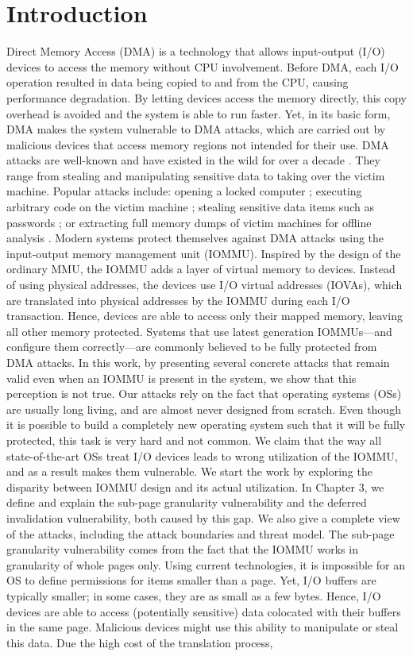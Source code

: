 \section{Introduction}
Direct Memory Access (DMA) is a technology that allows input-output (I/O) devices to access the memory without CPU involvement. Before DMA, each I/O operation resulted in data being copied to and from the CPU, causing performance degradation. By letting devices access the memory directly, this copy overhead is avoided and the system is able to run faster. Yet, in its basic form, DMA makes the system vulnerable to DMA attacks, which are carried out by malicious devices that access memory regions not intended for their use. DMA attacks are well-known and have existed in the wild for over a decade \cite{Dor04,BDK10}. They range from stealing and manipulating sensitive data to taking over the victim machine. Popular attacks include: opening a locked computer \cite{MM, Fin14}; executing arbitrary code on the victim machine \cite{Fri16, Woj08, AD10}; stealing sensitive data items such as passwords \cite{SB12, LKV13, Cim16, BR12}; or extracting full memory dumps of victim machines for offline analysis \cite{MM, Vol, Fin14, GA10}. Modern systems protect themselves against DMA attacks using the input-output memory management unit (IOMMU). Inspired by the design of the ordinary MMU, the IOMMU adds a layer of virtual memory to devices. Instead of using physical addresses, the devices use I/O virtual addresses (IOVAs), which are translated into physical addresses by the IOMMU during each I/O transaction. Hence, devices are able to access only their mapped memory, leaving all other memory protected. Systems that use latest generation IOMMUs—and configure them correctly—are commonly believed to be fully protected from DMA attacks. In this work, by presenting several concrete attacks that remain valid even when an IOMMU is present in the system, we show that this perception is not true. Our attacks rely on the fact that operating systems (OSs) are usually long living, and are almost never designed from scratch. Even though it is possible to build a completely new operating system such that it will be fully protected, this task is very hard and not common. We claim that the way all state-of-the-art OSs treat I/O devices leads to wrong utilization of the IOMMU, and as a result makes them vulnerable. We start the work by exploring the disparity between IOMMU design and its actual utilization. In Chapter 3, we define and explain the sub-page granularity vulnerability and the deferred invalidation vulnerability, both caused by this gap. We also give a complete view of the attacks, including the attack boundaries and threat model. The sub-page granularity vulnerability comes from the fact that the IOMMU works in granularity of whole pages only. Using current technologies, it is impossible for an OS to define permissions for items smaller than a page. Yet, I/O buffers are typically smaller; in some cases, they are as small as a few bytes. Hence, I/O devices are able to access (potentially sensitive) data colocated with their buffers in the same page. Malicious devices might use this ability to manipulate or steal this data. Due the high cost of the translation process, 